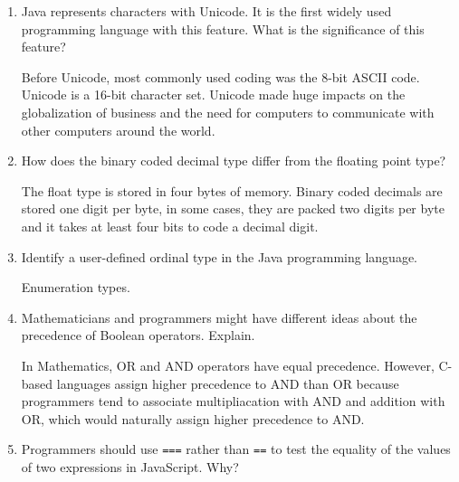 \begin{enumerate}
\begin{answer}
    \end{answer}

  \item Java represents characters with Unicode. It is the first
    widely used programming language with this feature. What is the
    significance of this feature?

  \begin{answer}

   Before Unicode, most commonly used coding was the 8-bit ASCII code. Unicode is a 16-bit character set. Unicode made huge impacts on the globalization of business and the need for computers to communicate with other computers around the world.    

    \end{answer}

  \item How does the binary coded decimal type differ from the
    floating point type?

  \begin{answer}

    The float type is stored in four bytes of memory. Binary coded decimals are stored one digit per byte, in some cases, they are packed two digits per byte and it takes at least four bits to code a decimal digit. 

    \end{answer}

  \item Identify a user-defined ordinal type in the Java programming
    language.

  \begin{answer}

    Enumeration types. 

    \end{answer}

  \item Mathematicians and programmers might have different ideas
    about the precedence of Boolean operators. Explain.

  \begin{answer}

    In Mathematics, OR and AND operators have equal precedence. However, C-based languages assign higher precedence to AND than OR because programmers tend to associate multipliacation with AND and addition with OR, which would naturally assign higher precedence to AND.

    \end{answer}

  \item Programmers should use \verb+===+ rather than \verb+==+ to
    test the equality of the values of two expressions in JavaScript. Why?


\end{enumerate}
